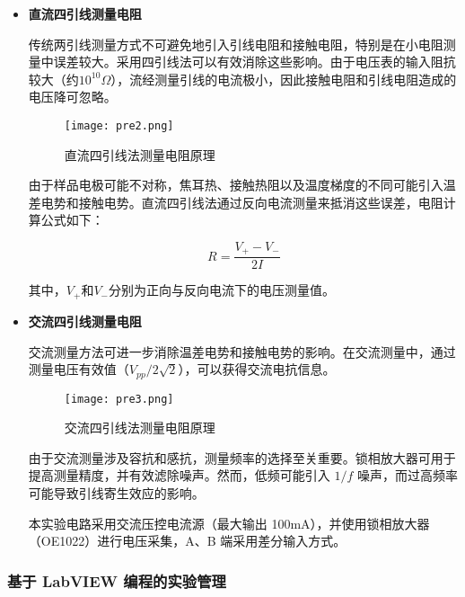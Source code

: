 \begin{itemize}
    \item \textbf{直流四引线测量电阻} 
    
    传统两引线测量方式不可避免地引入引线电阻和接触电阻，特别是在小电阻测量中误差较大。采用四引线法可以有效消除这些影响。由于电压表的输入阻抗较大（约$10^{10}\Omega$），流经测量引线的电流极小，因此接触电阻和引线电阻造成的电压降可忽略。
    
    \begin{figure}[h!]
        \centering
        \texttt{[image: pre2.png]}
        \caption{直流四引线法测量电阻原理}
        \label{fig:4wire_dc}
    \end{figure}
    
    由于样品电极可能不对称，焦耳热、接触热阻以及温度梯度的不同可能引入温差电势和接触电势。直流四引线法通过反向电流测量来抵消这些误差，电阻计算公式如下：
    
    \begin{equation}
    R = \frac{V_+ - V_-}{2I}
    \end{equation}
    
    其中，$V_+$和$V_-$分别为正向与反向电流下的电压测量值。
    
    \item \textbf{交流四引线测量电阻} 
    
    交流测量方法可进一步消除温差电势和接触电势的影响。在交流测量中，通过测量电压有效值（$V_{pp}/2\sqrt{2}$），可以获得交流电抗信息。
    
    \begin{figure}[h!]
        \centering
        \texttt{[image: pre3.png]}
        \caption{交流四引线法测量电阻原理}
        \label{fig:4wire_ac}
    \end{figure}
    
    由于交流测量涉及容抗和感抗，测量频率的选择至关重要。锁相放大器可用于提高测量精度，并有效滤除噪声。然而，低频可能引入 $1/f$ 噪声，而过高频率可能导致引线寄生效应的影响。
    
    本实验电路采用交流压控电流源（最大输出 100mA），并使用锁相放大器（OE1022）进行电压采集，A、B 端采用差分输入方式。
    
\end{itemize}

\subsubsection{基于 LabVIEW 编程的实验管理}

